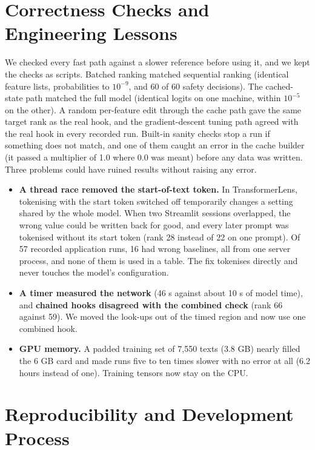 \section{Correctness Checks and Engineering Lessons}

We checked every fast path against a slower reference before using it, and we kept the checks as scripts. Batched ranking matched sequential ranking (identical feature lists, probabilities to $10^{-9}$, and 60 of 60 safety decisions). The cached-state path matched the full model (identical logits on one machine, within $10^{-5}$ on the other). A random per-feature edit through the cache path gave the same target rank as the real hook, and the gradient-descent tuning path agreed with the real hook in every recorded run. Built-in sanity checks stop a run if something does not match, and one of them caught an error in the cache builder (it passed a multiplier of 1.0 where 0.0 was meant) before any data was written. Three problems could have ruined results without raising any error.
\begin{itemize}
  \item \textbf{A thread race removed the start-of-text token.} In TransformerLens, tokenising with the start token switched off temporarily changes a setting shared by the whole model. When two Streamlit sessions overlapped, the wrong value could be written back for good, and every later prompt was tokenised without its start token (rank 28 instead of 22 on one prompt). Of 57 recorded application runs, 16 had wrong baselines, all from one server process, and none of them is used in a table. The fix tokenises directly and never touches the model's configuration.
  \item \textbf{A timer measured the network} (46 s against about 10 s of model time), and \textbf{chained hooks disagreed with the combined check} (rank 66 against 59). We moved the look-ups out of the timed region and now use one combined hook.
  \item \textbf{GPU memory.} A padded training set of 7,550 texts (3.8 GB) nearly filled the 6 GB card and made runs five to ten times slower with no error at all (6.2 hours instead of one). Training tensors now stay on the CPU.
\end{itemize}

\section{Reproducibility and Development Process}

